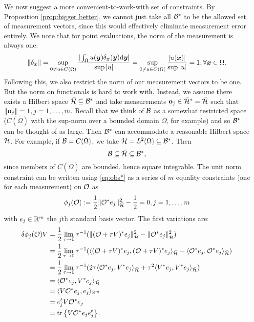 \documentclass{amsart}
\numberwithin{equation}{section}
\begin{document}
We now suggest a more convenient-to-work-with set of constraints. By
Proposition \ref{prop:bigger better}, we cannot just take all $\mathcal{B}^*$
to be the allowed set of measurement vectors, since this would
effectively eliminate measurement error entirely. We note that for
point evaluations, the norm of the measurement is always one:
\begin{align*}
  \| \delta_{{\boldsymbol{x}}} \| = \sup_{0 \neq u \in C(\Omega)} \frac{
    |\int_{\Omega}u({\boldsymbol{y}}) \delta_{{\boldsymbol{x}}}({\boldsymbol{y}}) \text{\textup{d}} {\boldsymbol{y}}| 
  }{
    \sup|u|}
  = \sup_{0 \neq u \in C(\Omega)} \frac{|u({\boldsymbol{x}})|}{ \sup|u|} = 1,
  \forall {\boldsymbol{x}} \in \Omega.
\end{align*}
Following this, we also restrict the norm of our measurement vectors
to be one. But the norm on functionals is hard to work with. Instead,
we assume there exists a Hilbert space $\bar{\mathcal{H}} \subseteq \mathcal{B}^*$
and take measurements $\mathbf{o}_j \in \bar{\mathcal{H}}^* = \bar{\mathcal{H}}$ such
that $\| \mathbf{o}_j\| = 1, j=1,\dots,m$. Recall that we think of $\mathcal{B}$ as
a somewhat restricted space ($C(\bar{\Omega})$ with the sup-norm over
a bounded domain $\Omega$, for example) and so $\mathcal{B}^*$ can be thought
of as large. Then $\mathcal{B}^*$ can accommodate a reasonable Hilbert space
$\bar{\mathcal{H}}$. For example, if $\mathcal{B} = C(\bar{\Omega})$, we take
$\bar{\mathcal{H}} = L^2(\Omega) \subseteq \mathcal{B}^*$.
Then
%
\begin{equation*}
  \mathcal{B} \subseteq \bar{\mathcal{H}} \subseteq \mathcal{B}^*,
\end{equation*}
since members of $C(\bar{\Omega})$ are bounded, hence square integrable. The
unit norm constraint can be written using \eqref{eq:obs*} as a series of $m$ equality
constraints (one for each measurement) on $\mathcal{O}$ as
\begin{align}\label{eq:constraints}
  \phi_j(\mathcal{O}) :=\frac12 \| \mathcal{O}^* e_j\|_{\bar{\mathcal{H}}}^2 - \frac12 = 0,j=1,\dots,m
\end{align}
with $e_j \in \mathbb{R}^m$ the $j$th standard basis vector. The first variations are:
\begin{align*}
  \delta \phi_j(\mathcal{O})V  
  &= \frac12\lim_{\tau \to 0}\tau^{-1}
  ( \|(\mathcal{O} + \tau V)^*e_j \|_{\bar{\mathcal{H}}}^2 - \|\mathcal{O} ^*e_j \|_{\bar{\mathcal{H}}}^2  ) \\
  &= \frac12\lim_{\tau \to 0}\tau^{-1}
  ( \langle (\mathcal{O} + \tau V)^*e_j, (\mathcal{O} + \tau V)^*e_j \rangle_{\bar{\mathcal{H}}} - 
  \langle \mathcal{O}^*e_j, \mathcal{O}^*e_j \rangle_{\bar{\mathcal{H}}} ) \\
  &= \frac12\lim_{\tau \to 0}\tau^{-1}
  (2\tau \langle \mathcal{O}^*e_j,V^*e_j \rangle_{\bar{\mathcal{H}}} 
  +\tau^2 \langle V^*e_j, V^*e_j \rangle_{\bar{\mathcal{H}}} ) \\
  &= \langle \mathcal{O}^*e_j,V^*e_j \rangle_{\bar{\mathcal{H}}} \\
  &= \langle V \mathcal{O}^*e_j,e_j \rangle_{\mathbb{R}^m} \\
  &= e_j^t V \mathcal{O}^* e_j \\
  &= \textup{tr}\left \{V \mathcal{O}^* e_je_j^t \right \}.
\end{align*}
\end{document}
